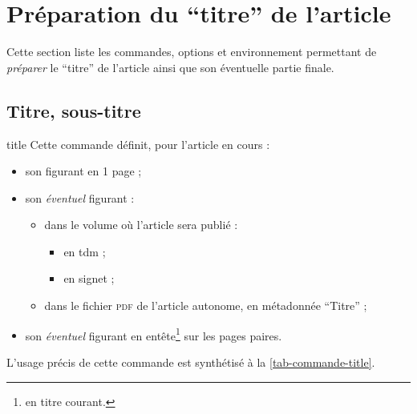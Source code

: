 \documentclass[french,nolocaltoc]{nwejmart}
\newtheorem[style=definition]{fait}
\newtheorem[title=contraventionnalisation]{ctrv}
\newtheorem[title-plural=anneaux]{anneau}
\newtheorem[title-plural=idéaux]{idéal}
\begin{document}
\section{Préparation du \enquote{titre} de l'article}
\label{sec-prep-de-lart}

Cette section liste les commandes, options et environnement permettant de
\emph{préparer} le \enquote{titre} de l'article ainsi que son éventuelle partie
finale.

\subsection{Titre, sous-titre}
\label{sec-titre}

\begin{docCommand}[doc new=2017-10-23]{title}{}
  Cette commande définit, pour l'article en cours :
  \begin{itemize}
  \item son  figurant en 1\iere{} page ;
  \item son \emph{éventuel}  figurant :
    \begin{itemize}
    \item dans le volume où l'article sera publié :
      \begin{itemize}
      \item en \gls{tdm} ;
      \item en signet ;
      \end{itemize}
    \item dans le fichier \textsc{pdf} de l'article autonome, en métadonnée
      \enquote{Titre} ;
    \end{itemize}
  \item son \emph{éventuel}  figurant en
    entête\footnote{\Ie{} en titre courant.} sur les pages paires.
  \end{itemize}
  L'usage précis de cette commande est synthétisé à la
  \vref{tab-commande-title}.
\end{docCommand}
\end{document}
